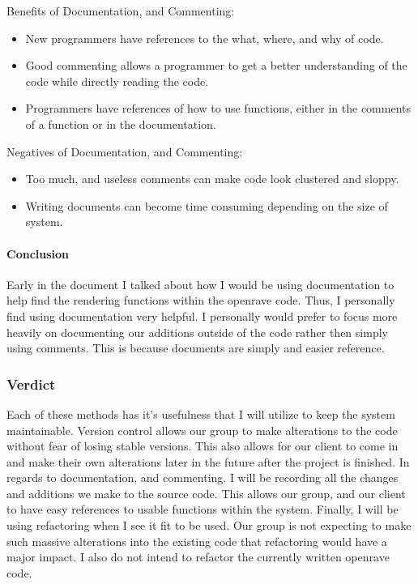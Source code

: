 \documentclass[10pt,journal,compsoc,draftclsnofoot]{IEEEtran}
\begin{document}
Benefits of Documentation, and Commenting:
\begin{itemize}
\item New programmers have references to the what, where, and why of code.
\item Good commenting allows a programmer to get a better understanding of the code while directly reading the code.
\item Programmers have references of how to use functions, either in the comments of a function or in the documentation.
\end{itemize}

Negatives of Documentation, and Commenting:
\begin{itemize}
\item Too much, and useless comments can make code look clustered and sloppy.
\item Writing documents can become time consuming depending on the size of system.
\end{itemize}

\paragraph{Conclusion}
\vspace{3mm}
Early in the document I talked about how I would be using documentation to help find the rendering functions within the openrave code.
Thus, I personally find using documentation very helpful.
I personally would prefer to focus more heavily on documenting our additions outside of the code rather then simply using comments.
This is because documents are simply and easier reference.

\subsubsection{Verdict}
Each of these methods has it's usefulness that I will utilize to keep the system maintainable.
Version control allows our group to make alterations to the code without fear of losing stable versions.
This also allows for our client to come in and make their own alterations later in the future after the project is finished.
In regards to documentation, and commenting.
I will be recording all the changes and additions we make to the source code.
This allows our group, and our client to have easy references to usable functions within the system.
Finally, I will be using refactoring when I see it fit to be used.
Our group is not expecting to make such massive alterations into the existing code that refactoring would have a major impact.
I also do not intend to refactor the currently written openrave code.
\end{document}
